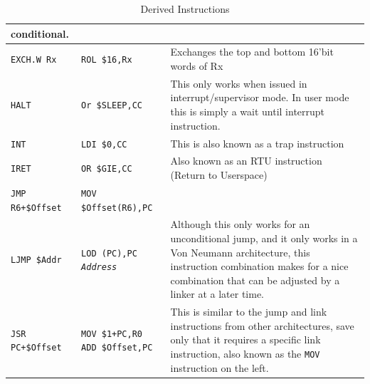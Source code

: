 \documentclass{gqtekspec}
\begin{document}
\begin{table}
\begin{center}
\begin{tabular}{p{1.4in}p{1.5in}p{3in}}
		conditional. \\\hline
{\tt EXCH.W Rx }
	& {\tt ROL \$16,Rx}
	& Exchanges the top and bottom 16'bit words of Rx \\\hline
{\tt HALT }
	& {\tt Or \$SLEEP,CC}
	& This only works when issued in interrupt/supervisor mode.  In user
	mode this is simply a wait until interrupt instruction. \\\hline
{\tt INT } & {\tt LDI \$0,CC} & This is also known as a trap instruction\\\hline
{\tt IRET}
	& {\tt OR \$GIE,CC}
	& Also known as an RTU instruction (Return to Userspace) \\\hline
{\tt JMP R6+\$Offset}
	& {\tt MOV \$Offset(R6),PC}
	& \\\hline
{\tt LJMP \$Addr}
	& \parbox[t]{1.5in}{\tt LOD (PC),PC \\ {\em Address }}
	& Although this only works for an unconditional jump, and it only
	works in a Von Neumann architecture, this instruction combination makes
	for a nice combination that can be adjusted by a linker at a later
	time.\\\hline
{\tt JSR PC+\$Offset  }
	& \parbox[t]{1.5in}{\tt MOV \$1+PC,R0 \\ ADD \$Offset,PC}
	& This is similar to the jump and link instructions from other
	architectures, save only that it requires a specific link
	instruction, also known as the {\tt MOV} instruction on the
	left.\\\hline
\end{tabular}
\caption{Derived Instructions}\label{tbl:derived-1}
\end{center}\end{table}
\end{document}
